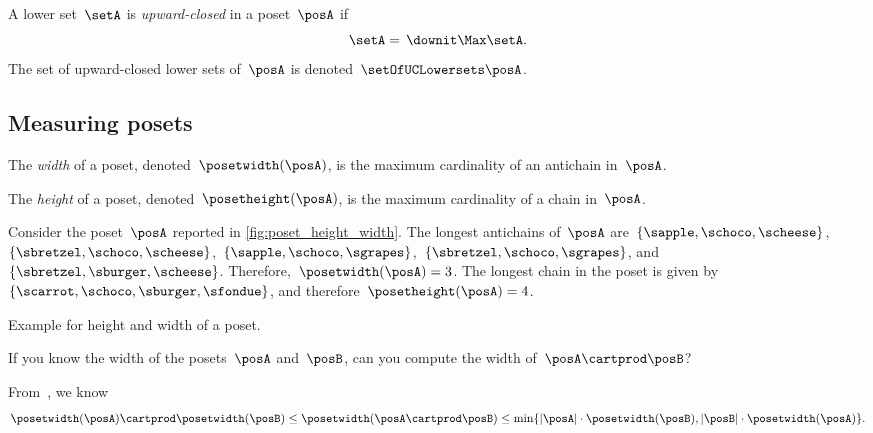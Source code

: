 \begin{definition}
	\label{def:upward-closed-lowerset}
	A lower set~$\setA$ is \emph{upward-closed} in a poset~$\posA$ if
	\begin{equation}
		\setA =\, \downit  \Max \setA.
	\end{equation}
	The set of upward-closed lower sets of~$\posA$ is denoted~$\setOfUCLowersets \posA$.

\end{definition}

\subsection{Measuring posets}
\begin{definition}
	\label{def:poset-width}
	The \emph{width} of a poset, denoted~$\posetwidth(\posA)$, is the maximum cardinality of an antichain in~$\posA$.
\end{definition}

\begin{definition}
	\label{def:poset-height}
	The \emph{height} of a poset, denoted~$\posetheight(\posA)$, is the maximum cardinality of a chain in~$\posA$.
\end{definition}

\begin{example}
	Consider the poset~$\posA$ reported in \cref{fig:poset_height_width}.
	The longest antichains of~$\posA$ are~$\{\sapple, \schoco, \scheese\}$,~$\{\sbretzel, \schoco, \scheese\}$,~$\{\sapple, \schoco, \sgrapes\}$,~$\{\sbretzel, \schoco, \sgrapes\}$, and~$\{\sbretzel, \sburger, \scheese\}$.
	Therefore,~$\posetwidth(\posA)=3$.
	The longest chain in the poset is given by~$\{\scarrot,\schoco,\sburger,\sfondue\}$, and therefore~$\posetheight(\posA)=4$.

	\begin{marginfigure}
		\caption{Example for height and width of a poset.}
	\end{marginfigure}
\end{example}

\begin{exercise}
	\label{ex:width}
	If you know the width of the posets~$\posA$ and~$\posB$, can you compute the width of~$\posA\cartprod\posB$?
\end{exercise}
\begin{solution}
	From~\cite{bezrukovantichains}, we know
	\begin{equation*}
		\posetwidth(\posA)\cartprod \posetwidth(\posB)\leq \posetwidth(\posA\cartprod \posB)\leq \min \{ \vert \posA\vert \cdot \posetwidth(\posB),\vert \posB \vert \cdot \posetwidth(\posA)\}.
	\end{equation*}
\end{solution}

